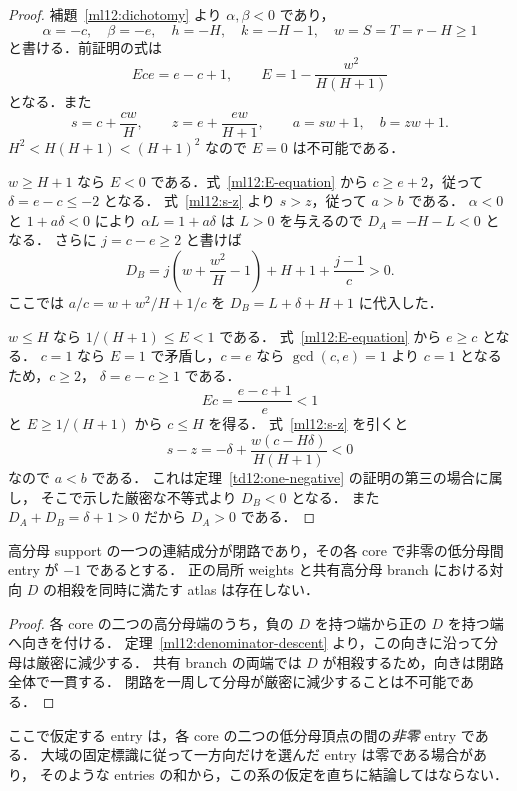 \begin{proof}
補題~\ref{ml12:dichotomy} より $\alpha,\beta<0$ であり，
\[
 \alpha=-c,\quad \beta=-e,\quad h=-H,\quad k=-H-1,
 \quad w=S=T=r-H\geq1
\]
と書ける．前証明の式は
\begin{equation}\label{ml12:E-equation}
 Ece=e-c+1,\qquad
 E=1-\frac{w^2}{H(H+1)}
\end{equation}
となる．また
\begin{equation}\label{ml12:s-z}
 s=c+\frac{cw}{H},\qquad z=e+\frac{ew}{H+1},\qquad
 a=sw+1,\quad b=zw+1.
\end{equation}
$H^2<H(H+1)<(H+1)^2$ なので $E=0$ は不可能である．

$w\geq H+1$ なら $E<0$ である．式~\eqref{ml12:E-equation} から
$c\geq e+2$，従って $\delta=e-c\leq-2$ となる．
式~\eqref{ml12:s-z} より $s>z$，従って $a>b$ である．
$\alpha<0$ と $1+a\delta<0$ により
$\alpha L=1+a\delta$ は $L>0$ を与えるので $D_A=-H-L<0$ となる．
さらに $j=c-e\geq2$ と書けば
\[
 D_B
 =j\left(w+\frac{w^2}{H}-1\right)+H+1+\frac{j-1}{c}>0.
\]
ここでは $a/c=w+w^2/H+1/c$ を
$D_B=L+\delta+H+1$ に代入した．

$w\leq H$ なら $1/(H+1)\leq E<1$ である．
式~\eqref{ml12:E-equation} から $e\geq c$ となる．
$c=1$ なら $E=1$ で矛盾し，$c=e$ なら
$\gcd(c,e)=1$ より $c=1$ となるため，$c\geq2$，
$\delta=e-c\geq1$ である．
\[
 Ec=\frac{e-c+1}{e}<1
\]
と $E\geq1/(H+1)$ から $c\leq H$ を得る．
式~\eqref{ml12:s-z} を引くと
\[
 s-z=-\delta+\frac{w(c-H\delta)}{H(H+1)}<0
\]
なので $a<b$ である．
これは定理~\ref{td12:one-negative} の証明の第三の場合に属し，
そこで示した厳密な不等式より $D_B<0$ となる．
また $D_A+D_B=\delta+1>0$ だから $D_A>0$ である．
\end{proof}

\begin{corollary}
\label{ml12:no-minimal-cycle}
高分母 support の一つの連結成分が閉路であり，その各 core で非零の低分母間 entry が $-1$ であるとする．
正の局所 weights と共有高分母 branch における対向 $D$ の相殺を同時に満たす atlas は存在しない．
\end{corollary}

\begin{proof}
各 core の二つの高分母端のうち，負の $D$ を持つ端から正の $D$ を持つ端へ向きを付ける．
定理~\ref{ml12:denominator-descent} より，この向きに沿って分母は厳密に減少する．
共有 branch の両端では $D$ が相殺するため，向きは閉路全体で一貫する．
閉路を一周して分母が厳密に減少することは不可能である．
\end{proof}

ここで仮定する entry は，各 core の二つの低分母頂点の間の\emph{非零} entry である．
大域の固定標識に従って一方向だけを選んだ entry は零である場合があり，
そのような entries の和から，この系の仮定を直ちに結論してはならない．
